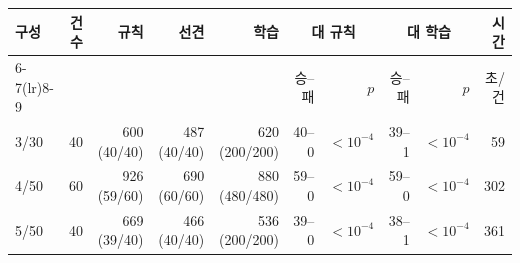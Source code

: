 \begin{tabular}{lrrrrrrrrr}
\toprule
구성 & 건수 & 규칙 & 선견 & 학습 & \multicolumn{2}{c}{대 규칙} & \multicolumn{2}{c}{대 학습} & 시간 \\
\cmidrule(lr){6-7}\cmidrule(lr){8-9}
 & & & & & 승--패 & $p$ & 승--패 & $p$ & 초/건 \\
\midrule
3/30 & 40 & 600 (40/40) & 487 (40/40) & 620 (200/200) & 40--0 & $<10^{-4}$ & 39--1 & $<10^{-4}$ & 59 \\
4/50 & 60 & 926 (59/60) & 690 (60/60) & 880 (480/480) & 59--0 & $<10^{-4}$ & 59--0 & $<10^{-4}$ & 302 \\
5/50 & 40 & 669 (39/40) & 466 (40/40) & 536 (200/200) & 39--0 & $<10^{-4}$ & 38--1 & $<10^{-4}$ & 361 \\
\bottomrule
\end{tabular}%
